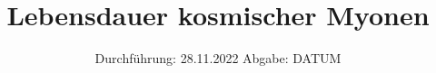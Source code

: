 

\subject{V01}
\title{Lebensdauer kosmischer Myonen}
\date{%
  Durchführung: 28.11.2022
  \hspace{3em}
  Abgabe: DATUM
}



\maketitle
\setcounter{page}{1}







\printbibliography{}



